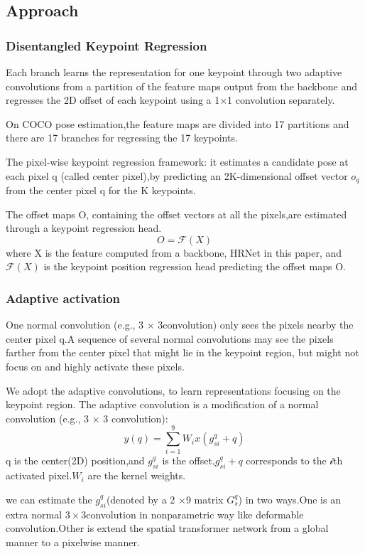 \documentclass[11pt]{article}
\begin{document}
\subsection{Approach}
\subsubsection{Disentangled Keypoint Regression}
Each branch learns the representation for one keypoint through two adaptive convolutions from a partition of the feature maps output from the backbone and regresses the 2D offset of each keypoint using a 1×1 convolution separately.

On COCO pose estimation,the feature maps are divided into 17 partitions and there are 17 branches for regressing the 17 keypoints.

The pixel-wise keypoint regression framework: it estimates a candidate pose at each pixel q (called center pixel),by predicting an 2K-dimensional offset vector $o_q$ from the center pixel q for the K keypoints.

The offset maps O, containing the offset vectors at all the pixels,are estimated through a keypoint regression head.
$$O=\mathcal{F}(X)$$
where X is the feature computed from a backbone, HRNet in this paper, and $\mathcal{F}(X)$ is the keypoint position regression head predicting the offset maps O.
\subsubsection{Adaptive activation}
One normal convolution (e.g., 3 × 3convolution) only sees the pixels nearby the center pixel q.A sequence of several normal convolutions may see the pixels farther from the center pixel that might lie in the keypoint region, but might not focus on and highly activate these pixels.

We adopt the adaptive convolutions, to learn representations focusing on the keypoint region. The adaptive convolution is a modification of a normal convolution (e.g., 3 × 3 convolution):
$$y(q)=\sum_{i=1}^{9}W_ix(g^q_{si}+q)$$
q is the center(2D) position,and $g^q_{si}$ is the offset,$g^q_{si} + q$ corresponds to the $\mathcal{i}$th activated pixel.$W_i$ are the kernel weights.

we can estimate the $g^q_{si}$(denoted by a 2 $\times $9 matrix $G_s^q$) in two ways.One is an extra normal $3\times 3$convolution in nonparametric way like deformable convolution.Other is extend the spatial transformer network from a global manner to a pixelwise manner.
\end{document}
